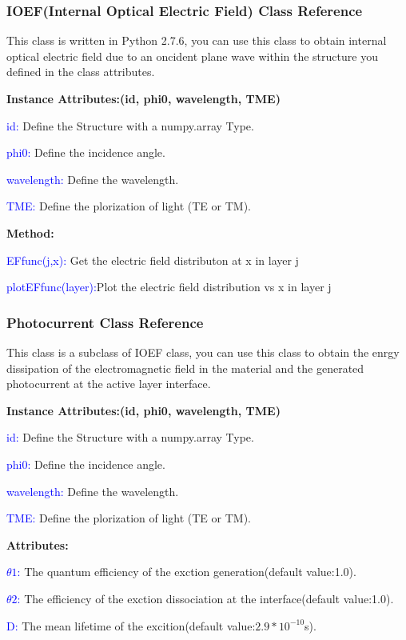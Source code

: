 \documentclass{article}
\begin{document}
\subsubsection{IOEF(Internal Optical Electric Field) Class Reference}
This class is written in Python 2.7.6, you can use this class to obtain internal
optical electric field due to an oncident plane wave
within the structure you defined in the class attributes.

\textbf{Instance Attributes:(id, phi0, wavelength, TME)}

\textcolor{blue}{id:} Define the Structure with a numpy.array Type.

\textcolor{blue}{phi0:} Define the incidence angle.

\textcolor{blue}{wavelength:} Define the wavelength.

\textcolor{blue}{TME:} Define the plorization of light (TE or TM).

\textbf{Method:}

\textcolor{blue}{EFfunc(j,x):} Get the electric field distributon at x in layer
j

\textcolor{blue}{plotEFfunc(layer):}Plot the electric field distribution vs x in
layer j
\subsubsection{Photocurrent Class Reference}
This class is a subclass of IOEF class, you can use this class to obtain the
enrgy dissipation of the electromagnetic field in the material and the
generated photocurrent at the active layer interface.

\textbf{Instance Attributes:(id, phi0, wavelength, TME)}

\textcolor{blue}{id:} Define the Structure with a numpy.array Type.

\textcolor{blue}{phi0:} Define the incidence angle.

\textcolor{blue}{wavelength:} Define the wavelength.

\textcolor{blue}{TME:} Define the plorization of light (TE or TM).

\textbf{Attributes:}

\textcolor{blue}{$\theta1$:} The quantum efficiency of the exction
generation(default value:1.0).

\textcolor{blue}{$\theta2$:} The efficiency of the exction dissociation at the
interface(default value:1.0).

\textcolor{blue}{D:} The mean lifetime of the excition(default
value:$2.9*10^{-10}$s).
\end{document}
